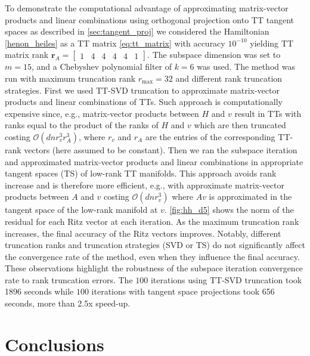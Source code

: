 \documentclass[10pt,preprint]{elsarticle}
\begin{document}
To demonstrate the computational advantage of approximating matrix-vector products and linear combinations using orthogonal projection onto TT tangent spaces as described in \cref{sec:tangent_proj} we considered the Hamiltonian \eqref{henon_heiles} as a TT matrix \eqref{eq:tt_matrix} with accuracy $10^{-10}$ yielding TT matrix rank $\bm r_{A} = \begin{bmatrix} 1 & 4 & 4 & 4 & 4 & 1 \end{bmatrix}$. The subspace dimension was set to $m=15$, and a Chebyshev polynomial filter of $k=6$ was used. The method was run with maximum truncation rank $r_{\textrm{max}} = 32$ and different rank truncation strategies. First we used TT-SVD truncation to approximate matrix-vector products and linear combinations of TTs. Such approach is computationally expensive since, e.g., matrix-vector products between $H$ and $v$ result in TTs with ranks equal to the product of the ranks of $H$ and $v$ which are then truncated costing $\mathcal{O}(dnr_v^3r_A^3)$, where $r_v$ and $r_A$ are the entries of the corresponding TT-rank vectors (here assumed to be constant). Then we ran the subspace iteration and approximated matrix-vector products and linear combinations in appropriate tangent spaces (TS) of low-rank TT manifolds. This approach avoids rank increase and is therefore more efficient, e.g., with approximate matrix-vector products between $A$ and $v$ costing $\mathcal{O}(dnr_v^3)$ where $Av$ is approximated in the tangent space of the low-rank manifold at $v$. 
%
\cref{fig:hh_d5} shows the norm of the residual for each Ritz vector at each iteration. As the maximum truncation rank increases, the final accuracy of the Ritz vectors improves. Notably, different truncation ranks and truncation strategies (SVD or TS) do not significantly affect the convergence rate of the method, even when they influence the final accuracy. These observations highlight the robustness of the subspace iteration convergence rate to rank truncation errors.
%
The $100$ iterations using TT-SVD truncation took 1896 seconds while $100$ iterations with tangent space projections took 656 seconds, more than 2.5x speed-up. 


\section{Conclusions}
\label{sec:conclusions}
\end{document}
